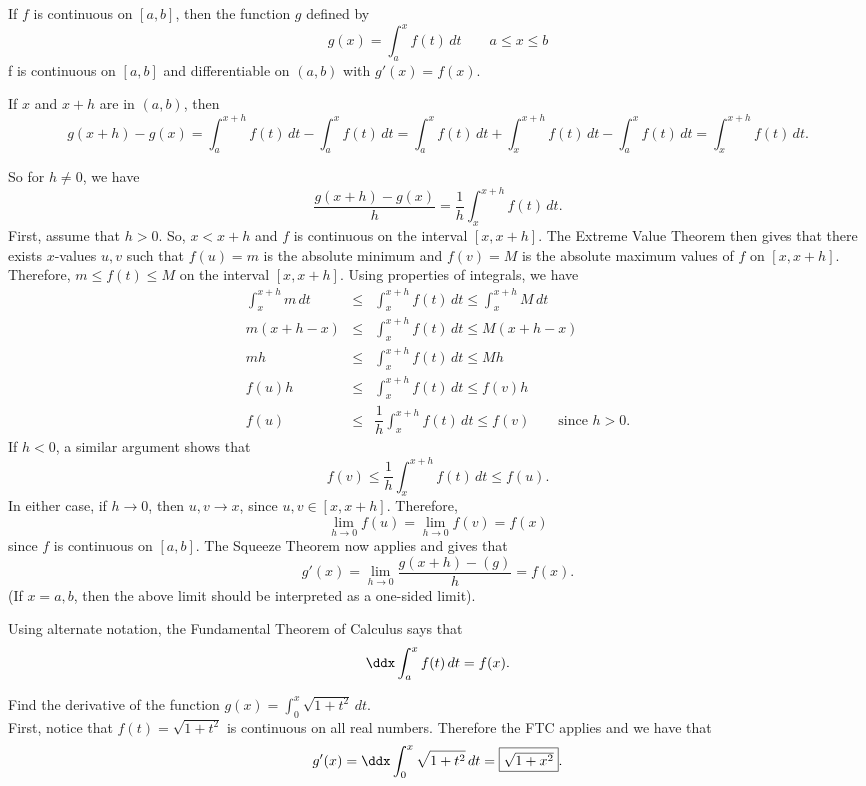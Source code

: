 \documentclass{book}
\newcommand{\dt}{\,dt}
\newcommand{\dint}{\displaystyle \int}
\begin{document}
\begin{Thm} If $f$ is continuous on $[a,b]$, then the function $g$ defined by \[g(x) = \int_a^x f(t)\dt\qquad a\le x\le b\] f is continuous on $[a,b]$ and differentiable on $(a,b)$ with $g'(x) = f(x)$.
\end{Thm}
\begin{pf}
If $x$ and $x+h$ are in $(a,b)$, then 
\[g(x+h) - g(x) = \int_a^{x+h} f(t)\dt - \int_a^x f(t)\dt = \int_a^x f(t)\dt + \int_{x}^{x+h} f(t)\dt - \int_a^x f(t)\dt = \int_x^{x+h} f(t)\dt.\]

So for $h\neq 0$, we have \[\dfrac{g(x+h)-g(x)}{h} = \dfrac{1}{h} \int_x^{x+h}f(t)\dt.\] 
First, assume that $h >0$. So, $x < x+h$ and $f$ is continuous on the interval $[x,x+h]$. The Extreme Value Theorem then gives that there exists $x$-values $u,v$ such that $f(u) = m$ is the absolute minimum and $f(v) = M$ is the absolute maximum values of $f$ on $[x,x+h]$. Therefore, $m \le f(t) \le M$ on the interval $[x,x+h]$. Using properties of integrals, we have 
\begin{eqnarray*}
\int_x^{x+h} m\dt &\le& \int_x^{x+h} f(t)\dt \le \int_x^{x+h} M\dt\\
m(x+h-x) &\le& \int_x^{x+h} f(t)\dt \le M(x+h-x)\\
mh &\le& \int_x^{x+h} f(t)\dt \le Mh\\
f(u)h &\le&\int_x^{x+h} f(t)\dt \le f(v)h\\
f(u) &\le & \dfrac{1}{h}\int_x^{x+h} f(t)\dt \le f(v) \qquad\mbox{since $h> 0$}.
\end{eqnarray*} If $h<0$, a similar argument shows that \[f(v) \le \dfrac{1}{h}\int_x^{x+h} f(t)\dt \le f(u).\] In either case, if $h\to 0$, then $u,v \to x$, since $u,v\in [x,x+h]$. Therefore, \[\lim_{h\to 0} f(u) = \lim_{h\to 0} f(v) = f(x)\] since $f$ is continuous on $[a,b]$. The Squeeze Theorem now applies and gives that \[g'(x) = \lim_{h\to 0} \dfrac{g(x+h)-(g)}{h} = f(x).\] (If $x=a,b$, then the above limit should be interpreted as a one-sided limit). 
\end{pf}\vs

Using alternate notation, the Fundamental Theorem of Calculus says that \[\ddx\int_a^x f(t)\dt = f(x).\]

\begin{Exam} Find the derivative of the function $g(x) = \dint_0^x \sqrt{1+t^2}\dt$.\\

First, notice that $f(t) = \sqrt{1+t^2}$ is continuous on all real numbers. Therefore the FTC applies and we have that \[g'(x) = \ddx\int_0^x \sqrt{1+t^2}\dt = \fbox{$\sqrt{1+x^2}$}. \]
\end{Exam}\vs
\end{document}
